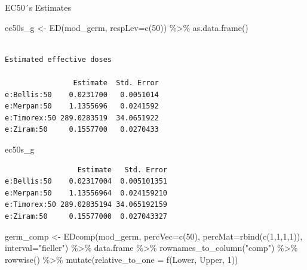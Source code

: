 \documentclass[
  letterpaper,
  DIV=11,
  numbers=noendperiod]{scrreport}
\newenvironment{Shaded}{\begin{snugshade}}{\end{snugshade}}
\newcommand{\AttributeTok}[1]{\textcolor[rgb]{0.40,0.45,0.13}{#1}}
\newcommand{\DecValTok}[1]{\textcolor[rgb]{0.68,0.00,0.00}{#1}}
\newcommand{\FunctionTok}[1]{\textcolor[rgb]{0.28,0.35,0.67}{#1}}
\newcommand{\NormalTok}[1]{\textcolor[rgb]{0.00,0.23,0.31}{#1}}
\newcommand{\OtherTok}[1]{\textcolor[rgb]{0.00,0.23,0.31}{#1}}
\newcommand{\SpecialCharTok}[1]{\textcolor[rgb]{0.37,0.37,0.37}{#1}}
\newcommand{\StringTok}[1]{\textcolor[rgb]{0.13,0.47,0.30}{#1}}
\begin{document}
EC50´s Estimates

\begin{Shaded}
\begin{Highlighting}[]
\NormalTok{ec50s\_g }\OtherTok{\textless{}{-}} \FunctionTok{ED}\NormalTok{(mod\_germ, }\AttributeTok{respLev=}\FunctionTok{c}\NormalTok{(}\DecValTok{50}\NormalTok{)) }\SpecialCharTok{\%\textgreater{}\%} \FunctionTok{as.data.frame}\NormalTok{()}
\end{Highlighting}
\end{Shaded}

\begin{verbatim}

Estimated effective doses

                Estimate  Std. Error
e:Bellis:50    0.0231700   0.0051014
e:Merpan:50    1.1355696   0.0241592
e:Timorex:50 289.0283519  34.0651922
e:Ziram:50     0.1557700   0.0270433
\end{verbatim}

\begin{Shaded}
\begin{Highlighting}[]
\NormalTok{ec50s\_g}
\end{Highlighting}
\end{Shaded}

\begin{verbatim}
                 Estimate   Std. Error
e:Bellis:50    0.02317004  0.005101351
e:Merpan:50    1.13556964  0.024159210
e:Timorex:50 289.02835194 34.065192159
e:Ziram:50     0.15577000  0.027043327
\end{verbatim}

\begin{Shaded}
\begin{Highlighting}[]
\NormalTok{germ\_comp }\OtherTok{\textless{}{-}} \FunctionTok{EDcomp}\NormalTok{(mod\_germ, }
       \AttributeTok{percVec=}\FunctionTok{c}\NormalTok{(}\DecValTok{50}\NormalTok{), }
       \AttributeTok{percMat=}\FunctionTok{rbind}\NormalTok{(}\FunctionTok{c}\NormalTok{(}\DecValTok{1}\NormalTok{,}\DecValTok{1}\NormalTok{,}\DecValTok{1}\NormalTok{,}\DecValTok{1}\NormalTok{)), }
       \AttributeTok{interval=}\StringTok{"fieller"}\NormalTok{)  }\SpecialCharTok{\%\textgreater{}\%} 
\NormalTok{    data.frame }\SpecialCharTok{\%\textgreater{}\%} 
  \FunctionTok{rownames\_to\_column}\NormalTok{(}\StringTok{"comp"}\NormalTok{) }\SpecialCharTok{\%\textgreater{}\%}
  \FunctionTok{rowwise}\NormalTok{() }\SpecialCharTok{\%\textgreater{}\%} 
  \FunctionTok{mutate}\NormalTok{(}\AttributeTok{relative\_to\_one =} \FunctionTok{f}\NormalTok{(Lower, Upper, }\DecValTok{1}\NormalTok{))}
\end{Highlighting}
\end{Shaded}
\end{document}
